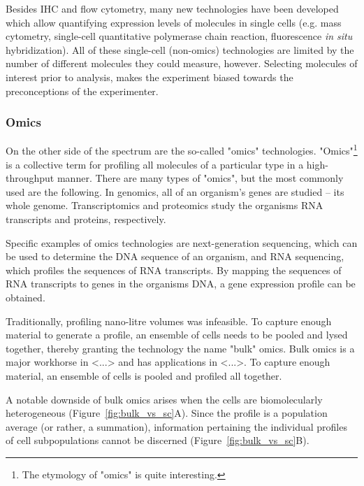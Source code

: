 Besides IHC and flow cytometry, many new technologies have been developed which allow quantifying expression levels of molecules in single cells (e.g. mass cytometry, single-cell quantitative polymerase chain reaction, fluorescence \emph{in situ} hybridization). All of these single-cell (non-omics) technologies are limited by the number of different molecules they could measure, however. Selecting molecules of interest prior to analysis, makes the experiment biased towards the preconceptions of the experimenter.

\subsubsection{Omics}
On the other side of the spectrum are the so-called "omics" technologies. "Omics"\footnote{The etymology of "omics" is quite interesting\cite{yadav_wholenesssuffixomics_2007}.} is a collective term for profiling all molecules of a particular type in a high-throughput manner.
There are many types of "omics", but the most commonly used are the following. In genomics, all of an organism's genes are studied -- its whole genome. Transcriptomics and proteomics study the organisms RNA transcripts and proteins, respectively. 

Specific examples of omics technologies are next-generation sequencing, which can be used to determine the DNA sequence of an organism, and RNA sequencing, which profiles the sequences of RNA transcripts. By mapping the sequences of RNA transcripts to genes in the organisms DNA, a gene expression profile can be obtained.

Traditionally, profiling nano-litre volumes was infeasible. To capture enough material to generate a profile, an ensemble of cells needs to be pooled and lysed together, thereby granting the technology the name "bulk" omics. 
Bulk omics is a major workhorse in <...> and has applications in <...>. To capture enough material, an ensemble of cells is pooled and profiled all together. 


A notable downside of bulk omics arises when the cells are biomolecularly heterogeneous (Figure~\ref{fig:bulk_vs_sc}A). Since the profile is a population average (or rather, a summation), information pertaining the individual profiles of cell subpopulations cannot be discerned (Figure~\ref{fig:bulk_vs_sc}B).




